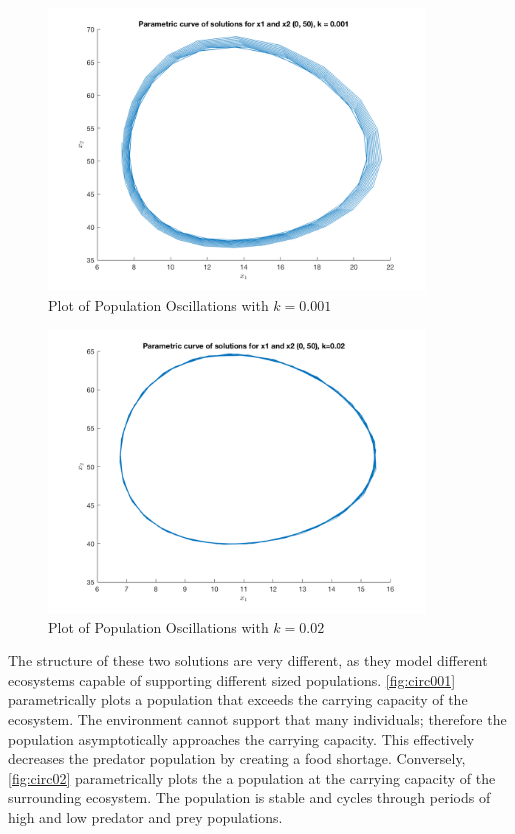 \documentclass[12pt]{article}   %
\theoremstyle{definition}
\numberwithin{equation}{section}
\begin{document}
\begin{figure} [h] 
  \centering
  \includegraphics[width=10cm]{images/circ001.png}
  \caption{Plot of Population Oscillations with $k=0.001$}
  \label{fig:circ001}
\end{figure}

\begin{figure} [h] 
  \centering
    \includegraphics[width=10cm]{images/circ02.png}
  \caption{Plot of Population Oscillations with $k=0.02$}
  \label{fig:circ02}
\end{figure}

\quad The structure of these two solutions are very different, as they model different ecosystems capable of supporting different sized populations. \autoref{fig:circ001} parametrically plots a population that exceeds the carrying capacity of the ecosystem. The environment cannot support that many individuals; therefore the population asymptotically approaches the carrying capacity. This effectively decreases the predator population by creating a food shortage. Conversely, \autoref{fig:circ02} parametrically plots the a population at the carrying capacity of the surrounding ecosystem. The population is stable and cycles through periods of high and low predator and prey populations.     
\end{document}
